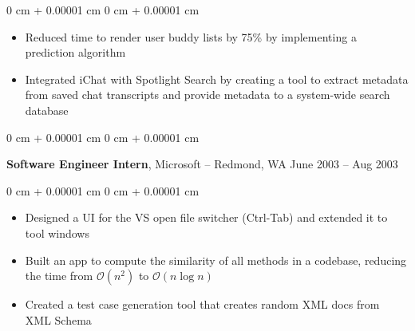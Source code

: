 \documentclass[10pt, letterpaper]{article}
\newenvironment{highlights}{
	\begin{itemize}[
		topsep=0.10 cm,
		parsep=0.10 cm,
		partopsep=0pt,
		itemsep=0pt,
		leftmargin=0 cm + 10pt
		]
	}{
	\end{itemize}
} %
\newenvironment{onecolentry}{
	\begin{adjustwidth}{
			0 cm + 0.00001 cm
		}{
			0 cm + 0.00001 cm
		}
	}{
	\end{adjustwidth}
} %
\newenvironment{twocolentry}[2][]{
	\onecolentry
	\def\secondColumn{#2}
	\setcolumnwidth{\fill, 4.5 cm}
	\begin{paracol}{2}
	}{
		\switchcolumn \raggedleft \secondColumn
	\end{paracol}
	\endonecolentry
} %
\begin{document}
	\vspace{0.10 cm}
	\begin{onecolentry}
		\begin{highlights}
			\item Reduced time to render user buddy lists by 75\% by implementing a prediction algorithm
			\item Integrated iChat with Spotlight Search by creating a tool to extract metadata from saved chat transcripts and provide metadata to a system-wide search database
		\end{highlights}
	\end{onecolentry}
	
	
	\vspace{0.2 cm}
	
	\begin{twocolentry}{
			June 2003 – Aug 2003
		}
		\textbf{Software Engineer Intern}, Microsoft -- Redmond, WA\end{twocolentry}
	
	\vspace{0.10 cm}
	\begin{onecolentry}
		\begin{highlights}
			\item Designed a UI for the VS open file switcher (Ctrl-Tab) and extended it to tool windows
			\item Built an app to compute the similarity of all methods in a codebase, reducing the time from $\mathcal{O}(n^2)$ to $\mathcal{O}(n \log n)$
			\item Created a test case generation tool that creates random XML docs from XML Schema
		\end{highlights}
	\end{onecolentry}
	
	
	
	
%	
%	
%	
%	
%		
%		
%			
%			
%	
%	
%	
\end{document}
